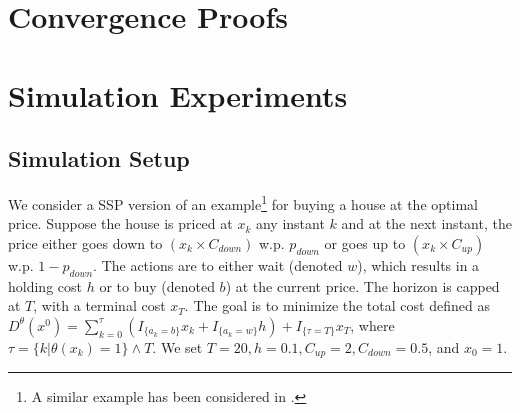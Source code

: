 \documentclass[11pt,letterpaper,english]{article}
\begin{document}
\section{Convergence Proofs}
\label{sec:convergence}

\section{Simulation Experiments}
\label{sec:expts}

\subsection{Simulation Setup}  
We consider a SSP version of an example\footnote{A similar example has been considered in \cite{chow2014algorithms}.} for buying a house at the optimal price. Suppose the house is priced at $x_k$ any instant $k$ and at the next instant, the price either goes down to $\left(x_k \times C_{down}\right)$ w.p. $p_{down}$ or goes up to $\left(x_k\times C_{up}\right)$ w.p. $1-p_{down}$. The actions are to either wait (denoted $w$), which results in a holding cost $h$ or to buy (denoted $b$) at the current price. The horizon is capped at $T$, with a terminal cost $x_T$.  The goal is to minimize the total cost defined as $ 
D^{\theta}(x^0)= \sum_{k=0}^\tau \left(I_{\{a_k =b \} }x_k+I_{\{a_k =w \} } h\right) + I_{\{\tau=T\}} x_T$, where $\tau =  \{k | \theta(x_k)=1 \} \wedge T$.
We set $T=20, h=0.1, C_{up}=2, C_{down}=0.5$, and $x_0=1$.  
\end{document}
